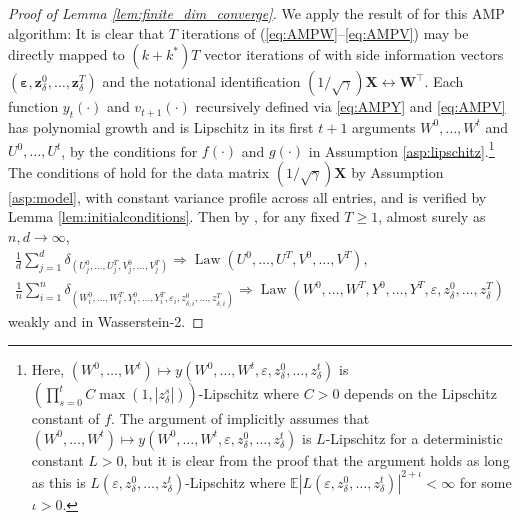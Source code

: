\documentclass[11pt,letterpaper,reqno]{amsart}
\theoremstyle{definition}
\def\eps{\varepsilon}
\def\E{\mathbb{E}}
\def\Law{\operatorname{Law}}
\def\z{\mathbf{z}}
\def\W{\mathbf{W}}
\def\X{\mathbf{X}}
\def\beps{\boldsymbol{\varepsilon}}
\begin{document}
\begin{proof}[Proof of Lemma \ref{lem:finite_dim_converge}]
We apply the result of \cite[Theorem 2.21]{wang2024universality} for this AMP
algorithm: It is clear that
$T$ iterations of (\ref{eq:AMPW}--\ref{eq:AMPV}) may be directly mapped to
$(k+k^*)T$ vector iterations of
\cite[Eqs.\ (2.14) and (D.1--D.2)]{wang2024universality} with
side information vectors $(\beps,\z_\delta^0,\ldots,\z_\delta^T)$
and the notational identification $(1/\sqrt{\gamma})\X \leftrightarrow \W^\top$.
Each function
$y_t(\cdot)$ and $v_{t+1}(\cdot)$ recursively defined via \eqref{eq:AMPY} and
\eqref{eq:AMPV} has polynomial growth and is Lipschitz in its first $t+1$
arguments $W^0,\ldots,W^t$ and $U^0,\ldots,U^t$, by the conditions for
$f(\cdot)$ and $g(\cdot)$ in Assumption \ref{asp:lipschitz}.\footnote{Here,
$(W^0,\ldots,W^t) \mapsto y(W^0,\ldots,W^t,\eps,z_\delta^0,\ldots,z_\delta^t)$
is $(\prod_{s=0}^t C\max(1,|z_\delta^s|))$-Lipschitz where $C>0$ depends on the
Lipschitz constant of $f$. The argument of \cite[Theorem
2.21]{wang2024universality} implicitly assumes that
$(W^0,\ldots,W^t) \mapsto y(W^0,\ldots,W^t,\eps,z_\delta^0,\ldots,z_\delta^t)$
is $L$-Lipschitz for a deterministic constant $L>0$, but it is clear from the
proof that the argument holds as long as this is
$L(\eps,z_\delta^0,\ldots,z_\delta^t)$-Lipschitz where
$\E|L(\eps,z_\delta^0,\ldots,z_\delta^t)|^{2+\iota}<\infty$ for some $\iota>0$.}
The conditions of \cite[Definition 2.18]{wang2024universality} hold for
the data matrix
$(1/\sqrt{\gamma})\X$ by Assumption \ref{asp:model}, with constant 
variance profile across all entries, and \cite[Assumption
2.17]{wang2024universality} is verified by Lemma \ref{lem:initialconditions}.
Then by \cite[Theorem 2.21]{wang2024universality}, for any fixed $T \geq 1$,
almost surely as $n,d\to\infty$,
\begin{equation}\label{eq:state_evolution}
\begin{gathered}
\frac{1}{d}\sum_{j=1}^d \delta_{(U_j^0,\ldots,U_j^T,V_j^0,\ldots,V_j^T)} \Rightarrow
\Law(U^0,\ldots,U^T,V^0,\ldots,V^T),\\
\frac{1}{n}\sum_{i=1}^n
\delta_{(W_i^0,\ldots,W_i^T,Y_i^0,\ldots,Y_i^T,\eps_i,z_{\delta,i}^0,\ldots,z_{\delta,i}^T)} \Rightarrow
\Law(W^0,\ldots,W^T,Y^0,\ldots,Y^T,\eps,z_\delta^0,\ldots,z_\delta^T)
\end{gathered}
\end{equation}
weakly and in Wasserstein-2.


\end{proof}
\end{document}
